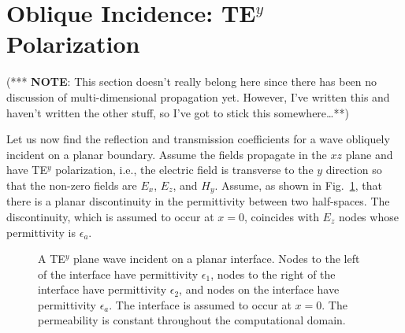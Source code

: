 \newpage

\section{Oblique Incidence: TE$^y$ Polarization}

(*** {\bf NOTE}:  This section doesn't really belong here since there
has been no discussion of multi-dimensional propagation yet.  However,
I've written this and haven't written the other stuff, so I've got to
stick this somewhere\ldots ***)

Let us now find the reflection and transmission coefficients for a
wave obliquely incident on a planar boundary.  Assume the fields
propagate in the $xz$ plane and have TE$^y$ polarization, i.e., the
electric field is transverse to the $y$ direction so that the non-zero
fields are $E_x$, $E_z$, and $H_y$.  Assume, as shown in Fig.\
\ref{fig:teYHalfSpace}, that there is a planar discontinuity in the
permittivity between two half-spaces.  The discontinuity, which is
assumed to occur at $x=0$, coincides with $E_z$ nodes whose
permittivity is $\epsilon_a$.

\begin{figure}
  \begin{center}
  \end{center}
  \caption{A TE$^y$ plane wave incident on a planar interface.  Nodes
  to the left of the interface have permittivity $\epsilon_1$, nodes
  to the right of the interface have permittivity $\epsilon_2$, and
  nodes on the interface have permittivity $\epsilon_a$.  The
  interface is assumed to occur at $x=0$.  The permeability is
  constant throughout the computational domain.}
  \label{fig:teYHalfSpace}
\end{figure}

